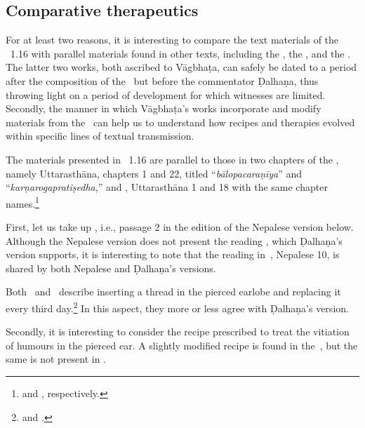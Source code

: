 \subsection{Comparative therapeutics} 

For at least two reasons, it is interesting to compare the text materials of the
\SS~1.16 with parallel materials found in other texts, including the \CS, the \AS,
and the \AHS. The latter two works, both ascribed to Vāgbhaṭa, can safely be dated
to a period after the composition of the \SS\ but before the commentator Ḍalhaṇa,
thus throwing light on a period of development for which witnesses are limited.
Secondly, the manner in which Vāgbhaṭa's works incorporate and modify materials
from the \SS\ can help us to understand how recipes and therapies evolved within
specific lines of textual transmission.

The materials presented in \SS~1.16 are parallel to those in two chapters of the
\AS, namely Uttarasthāna, chapters 1 and 22, titled “\emph{bālopacaraṇīya}” and
“\emph{karṇarogapratiṣedha},” and \AHS, Uttarasthāna 1 and 18 with the same chapter
names.\footnote{\cite[619--629 and 734--744]{atha-1980} and \cite[777--781 and  
837--841	`]{kunt-1939}, respectively.}

First, let us take up , i.e., passage 2 in the edition of the
Nepalese version below. %
Although the Nepalese version does not present the reading , which Ḍalhaṇa’s version supports, it is interesting to note that the
reading  in \SS\,, Nepalese 10,  is
shared by both Nepalese and Ḍalhaṇa’s versions.

Both \AS\, and \AHS\, describe inserting a thread
in the pierced earlobe and replacing it every third day.\footnote{
    and .} %
    In this aspect, they more or less agree with Ḍalhaṇa’s version.

Secondly, it is interesting to consider the recipe prescribed to treat the vitiation
of humours in the pierced ear. A slightly modified recipe is found in the 
\AS\,, but the same is not present in \AHS.

